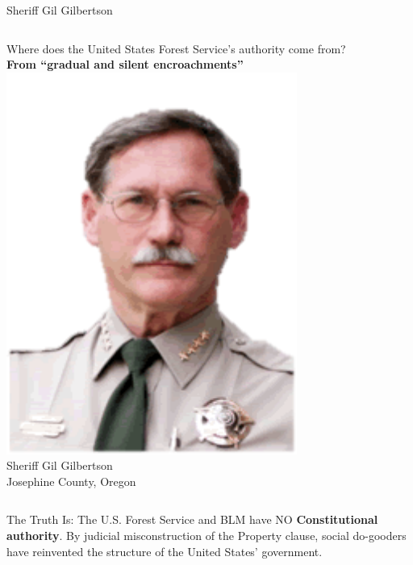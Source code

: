 \begin{frame}{Sheriff Gil Gilbertson}
    \begin{columns}[onlytextwidth]
            \centering
            Where does the United States Forest Service's authority come from? \\
            \vspace{20pt}
            \textbf{ \Large \color{red}
                From ``gradual and silent encroachments''
            }
            \centering
            \includegraphics[width=0.75\textwidth]{img/gil-gilbertson.png}
            \\ Sheriff Gil Gilbertson
            \\ Josephine County, Oregon
    \end{columns}
\end{frame}

\begin{frame}{The Truth Is:}
    \large
    The U.S. Forest Service and BLM have NO \textbf{Constitutional authority}.
    By judicial misconstruction of the Property clause, social do-gooders have
    reinvented the structure of the United States' government.
\end{frame}


